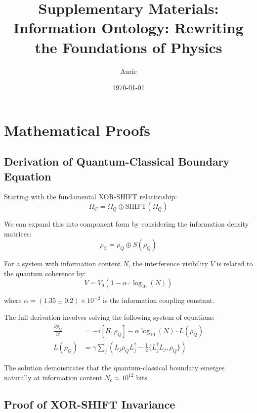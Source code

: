 \documentclass[12pt,letterpaper]{article}
\title{Supplementary Materials: Information Ontology: Rewriting the Foundations of Physics}
\author{Auric}
\date{\today}
\newcommand{\xor}{\oplus}
\newcommand{\shift}{\text{SHIFT}}
\begin{document}
\maketitle

\tableofcontents
\newpage

\section{Mathematical Proofs}

\subsection{Derivation of Quantum-Classical Boundary Equation}

Starting with the fundamental XOR-SHIFT relationship:
\begin{equation}
\Omega_C = \Omega_Q \xor \shift(\Omega_Q)
\end{equation}

We can expand this into component form by considering the information density matrices:
\begin{equation}
\rho_C = \rho_Q \xor S(\rho_Q)
\end{equation}

For a system with information content $N$, the interference visibility $V$ is related to the quantum coherence by:
\begin{equation}
V = V_0\left(1 - \alpha \cdot \log_{10}(N)\right)
\end{equation}

where $\alpha = (1.35 \pm 0.2) \times 10^{-2}$ is the information coupling constant.

The full derivation involves solving the following system of equations:
\begin{align}
\frac{\partial \rho_Q}{\partial t} &= -i[H, \rho_Q] - \alpha \log_{10}(N) \cdot L(\rho_Q)\\
L(\rho_Q) &= \gamma \sum_j \left( L_j\rho_Q L_j^\dagger - \frac{1}{2}\{L_j^\dagger L_j, \rho_Q\} \right)
\end{align}

The solution demonstrates that the quantum-classical boundary emerges naturally at information content $N_c \approx 10^{12}$ bits.

\subsection{Proof of XOR-SHIFT Invariance}
\end{document}
